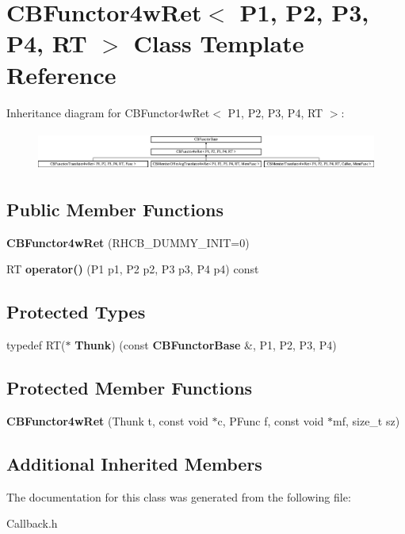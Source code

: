 \section{C\+B\+Functor4w\+Ret$<$ P1, P2, P3, P4, RT $>$ Class Template Reference}
\label{classCBFunctor4wRet}
Inheritance diagram for C\+B\+Functor4w\+Ret$<$ P1, P2, P3, P4, RT $>$\+:\begin{figure}[H]
\begin{center}
\leavevmode
\includegraphics[height=1.317647cm]{classCBFunctor4wRet}
\end{center}
\end{figure}
\subsection*{Public Member Functions}
\begin{DoxyCompactItemize}
\item 
{\bfseries C\+B\+Functor4w\+Ret} (R\+H\+C\+B\+\_\+\+D\+U\+M\+M\+Y\+\_\+\+I\+N\+IT=0)\label{classCBFunctor4wRet_a36a036c2ab029c219d7e0f76f5c6888b}

\item 
RT {\bfseries operator()} (P1 p1, P2 p2, P3 p3, P4 p4) const \label{classCBFunctor4wRet_a4ba872c7ae7fb3a7395378ceb76b6bb9}

\end{DoxyCompactItemize}
\subsection*{Protected Types}
\begin{DoxyCompactItemize}
\item 
typedef RT($\ast$ {\bfseries Thunk}) (const {\bf C\+B\+Functor\+Base} \&, P1, P2, P3, P4)\label{classCBFunctor4wRet_a5c7270c86a1346f53f9678ce0b1ed8ae}

\end{DoxyCompactItemize}
\subsection*{Protected Member Functions}
\begin{DoxyCompactItemize}
\item 
{\bfseries C\+B\+Functor4w\+Ret} (Thunk t, const void $\ast$c, P\+Func f, const void $\ast$mf, size\+\_\+t sz)\label{classCBFunctor4wRet_a93a203354ea5a58176c3c37222b19deb}

\end{DoxyCompactItemize}
\subsection*{Additional Inherited Members}


The documentation for this class was generated from the following file\+:\begin{DoxyCompactItemize}
\item 
Callback.\+h\end{DoxyCompactItemize}

